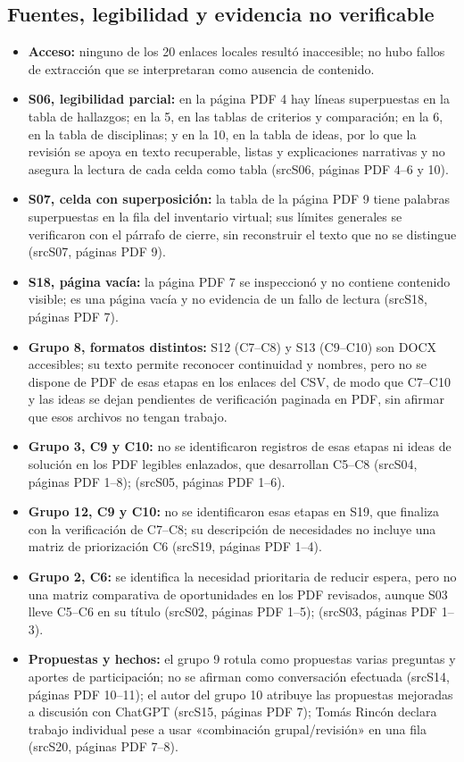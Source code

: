 \documentclass[11pt,a4paper]{article}
\newcommand{\evid}[2]{(\csname src#1\endcsname, páginas PDF #2)}
\begin{document}
\subsection*{Fuentes, legibilidad y evidencia no verificable}
\begin{itemize}
\item \textbf{Acceso:} ninguno de los 20 enlaces locales resultó inaccesible; no hubo fallos de extracción que se interpretaran como ausencia de contenido.
\item \textbf{S06, legibilidad parcial:} en la página PDF 4 hay líneas superpuestas en la tabla de hallazgos; en la 5, en las tablas de criterios y comparación; en la 6, en la tabla de disciplinas; y en la 10, en la tabla de ideas, por lo que la revisión se apoya en texto recuperable, listas y explicaciones narrativas y no asegura la lectura de cada celda como tabla \evid{S06}{4--6 y 10}.
\item \textbf{S07, celda con superposición:} la tabla de la página PDF 9 tiene palabras superpuestas en la fila del inventario virtual; sus límites generales se verificaron con el párrafo de cierre, sin reconstruir el texto que no se distingue \evid{S07}{9}.
\item \textbf{S18, página vacía:} la página PDF 7 se inspeccionó y no contiene contenido visible; es una página vacía y no evidencia de un fallo de lectura \evid{S18}{7}.
\item \textbf{Grupo 8, formatos distintos:} S12 (C7--C8) y S13 (C9--C10) son DOCX accesibles; su texto permite reconocer continuidad y nombres, pero no se dispone de PDF de esas etapas en los enlaces del CSV, de modo que C7--C10 y las ideas se dejan pendientes de verificación paginada en PDF, sin afirmar que esos archivos no tengan trabajo.
\item \textbf{Grupo 3, C9 y C10:} no se identificaron registros de esas etapas ni ideas de solución en los PDF legibles enlazados, que desarrollan C5--C8 \evid{S04}{1--8}; \evid{S05}{1--6}.
\item \textbf{Grupo 12, C9 y C10:} no se identificaron esas etapas en S19, que finaliza con la verificación de C7--C8; su descripción de necesidades no incluye una matriz de priorización C6 \evid{S19}{1--4}.
\item \textbf{Grupo 2, C6:} se identifica la necesidad prioritaria de reducir espera, pero no una matriz comparativa de oportunidades en los PDF revisados, aunque S03 lleve C5--C6 en su título \evid{S02}{1--5}; \evid{S03}{1--3}.
\item \textbf{Propuestas y hechos:} el grupo 9 rotula como propuestas varias preguntas y aportes de participación; no se afirman como conversación efectuada \evid{S14}{10--11}; el autor del grupo 10 atribuye las propuestas mejoradas a discusión con ChatGPT \evid{S15}{7}; Tomás Rincón declara trabajo individual pese a usar «combinación grupal/revisión» en una fila \evid{S20}{7--8}.
\end{itemize}
\end{document}
